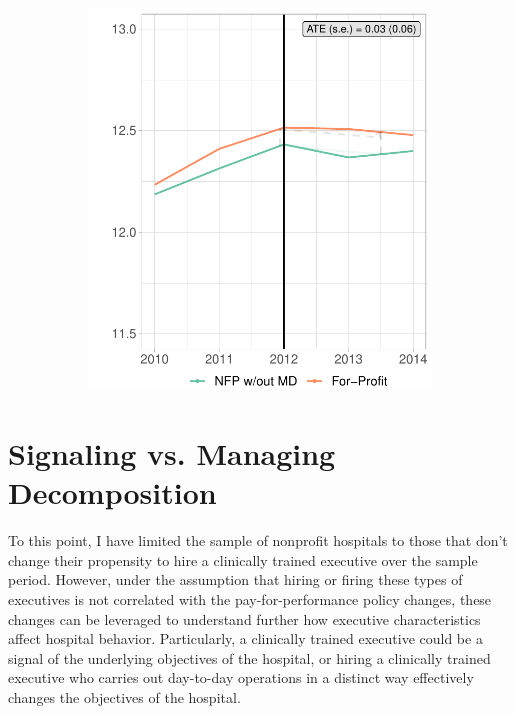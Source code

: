 \documentclass[12pt]{article}
\begin{document}
\begin{figure}[ht!]
\begin{subfigure}[b]{0.45\textwidth}
         \includegraphics[width=\textwidth]{Objects/mort_fp_nomd_synth_graph.pdf}
         \label{fig:mort_synth_plotc}
     \end{subfigure}
        \label{fig:mort_synth_plot}
    \end{figure}
    

\section{Signaling vs. Managing Decomposition}

    To this point, I have limited the sample of nonprofit hospitals to those that don't change their propensity to hire a clinically trained executive over the sample period. However, under the assumption that hiring or firing these types of executives is not correlated with the pay-for-performance policy changes, these changes can be leveraged to understand further how executive characteristics affect hospital behavior. Particularly, a clinically trained executive could be a signal of the underlying objectives of the hospital, or hiring a clinically trained executive who carries out day-to-day operations in a distinct way effectively changes the objectives of the hospital. 
\end{document}
